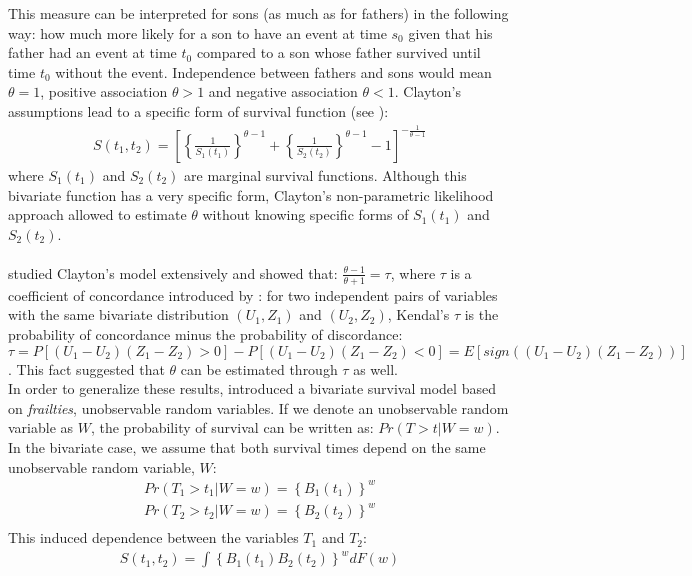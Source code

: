 \documentclass[]{article}
\begin{document}
This measure can be interpreted for sons (as much as for fathers) in the following way: how much more likely for a son to have an event at time $s_0$ given that his father had an event at time $t_0$ compared to a son whose father survived until time $t_0$ without the event. Independence between fathers and sons would mean $\theta = 1$, positive association $\theta > 1$ and negative association $\theta < 1$.
Clayton's assumptions lead to a specific form of survival function (see \cite{oakes1989bivariate}):
$$
\begin{aligned}
S(t_1,t_2) = \left[\left\{ \frac{1}{S_1(t_1)} \right\}^{\theta - 1} + \left\{ \frac{1}{S_2(t_2)} \right\}^{\theta - 1}   - 1 \right]^{-\frac{1}{\theta-1}}
\end{aligned}
$$
where $S_1(t_1)$ and $S_2(t_2)$ are marginal survival functions. Although this bivariate function has a very specific form, Clayton's non-parametric likelihood approach allowed to estimate $\theta$ without knowing specific forms of $S_1(t_1)$ and $S_2(t_2)$.\\
~\\
\cite{oakes1982model} studied Clayton's model extensively and showed that: $\frac{\theta - 1}{\theta + 1} = \tau$, where $\tau$ is a coefficient of concordance introduced by  \cite{kendall1938new}: for two independent pairs of variables with the same bivariate distribution $(U_1, Z_1)$ and $(U_2, Z_2)$, Kendal's $\tau$ is the probability of concordance minus the probability of discordance:
$\tau = P[(U_1 - U_2)(Z_1 - Z_2)>0] - P[(U_1 - U_2)(Z_1 - Z_2)<0] = E[sign((U_1 - U_2)(Z_1 - Z_2))]$. This fact suggested that $\theta$ can be estimated through $\tau$ as well.\\

In order to generalize these results, \cite{oakes1989bivariate} introduced a bivariate survival model based on \emph{frailties}, unobservable random variables. If we denote an unobservable random variable as $W$, the probability of survival can be written as: $Pr(T>t|W=w)$. In the bivariate case, we assume that both survival times depend on the same unobservable random variable, $W$:
$$
\begin{aligned}
	Pr(T_1>t_1|W=w)=\left\{ B_1(t_1) \right\}^w\\
	Pr(T_2>t_2|W=w)=\left\{ B_2(t_2) \right\}^w\\
\end{aligned}
$$
This induced dependence between the variables $T_1$ and $T_2$:
$$
\begin{aligned}
	S(t_1,t_2) = \int \left\{ B_1(t_1) B_2(t_2)\right\}^w dF(w)
\end{aligned}
$$
\end{document}
